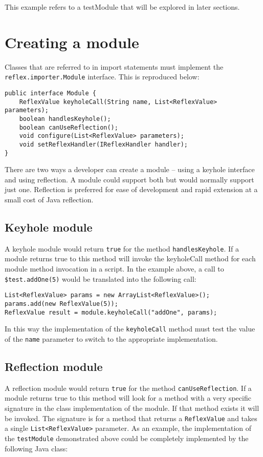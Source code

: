 This example refers to a testModule that will be explored in later sections.

\section{Creating a module}
Classes that are referred to in import statements must implement the \Verb+reflex.importer.Module+ interface. This is reproduced below:
\begin{lstlisting}[caption={Module interface}]
public interface Module {
    ReflexValue keyholeCall(String name, List<ReflexValue> parameters);
    boolean handlesKeyhole();
    boolean canUseReflection();
    void configure(List<ReflexValue> parameters);   
    void setReflexHandler(IReflexHandler handler);
}
\end{lstlisting}
There are two ways a developer can create a module -- using a keyhole interface and using reflection. A module could support both but would normally support just one. Reflection is preferred for ease of development and rapid extension at a small cost of Java reflection.
\subsection{Keyhole module}
A keyhole module would return \Verb+true+ for the method \verb+handlesKeyhole+. If a module returns true to this method \Reflex will invoke the keyholeCall method for each module method invocation in a \Reflex script. In the example above, a call to \verb+$test.addOne(5)+ would be translated into the following call:

\begin{Verbatim}
List<ReflexValue> params = new ArrayList<ReflexValue>();
params.add(new ReflexValue(5));
ReflexValue result = module.keyholeCall("addOne", params);
\end{Verbatim}

In this way the implementation of the \Verb+keyholeCall+ method must test the value of the \verb+name+ parameter to switch to the appropriate implementation.

\subsection{Reflection module}
A reflection module would return \Verb+true+ for the method \verb+canUseReflection+. If a module returns true to this method \Reflex will look for a method with a very specific signature in the class implementation of the module. If that method exists it will be invoked. The signature is for a method that returns a \verb+ReflexValue+ and takes a single \verb+List<ReflexValue>+ parameter. As an example, the implementation of the \verb+testModule+ demonstrated above could be completely implemented by the following Java class:


